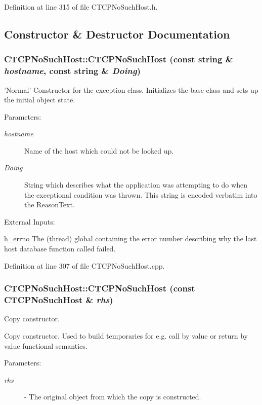 Definition at line 315 of file CTCPNo\-Such\-Host.h.

\subsection{Constructor \& Destructor Documentation}
\subsubsection{\setlength{\rightskip}{0pt plus 5cm}CTCPNo\-Such\-Host::CTCPNo\-Such\-Host (const string \& {\em hostname}, const string \& {\em Doing})}\label{classCTCPNoSuchHost_a0}


'Normal' Constructor for the exception class. Initializes the base class and sets up the initial object state.\begin{Desc}
\item[Parameters: ]\par
\begin{description}
\item[{\em 
hostname}]Name of the host which could not be looked up. \item[{\em 
Doing}]String which describes what the application was attempting to do when the exceptional condition was thrown. This string is encoded verbatim into the Reason\-Text.\end{description}
\end{Desc}
External Inputs:\begin{CompactItemize}
\item 
h\_\-errno The (thread) global containing the error number describing why the last host database function called failed. \end{CompactItemize}


Definition at line 307 of file CTCPNo\-Such\-Host.cpp.
\subsubsection{\setlength{\rightskip}{0pt plus 5cm}CTCPNo\-Such\-Host::CTCPNo\-Such\-Host (const CTCPNo\-Such\-Host \& {\em rhs})}\label{classCTCPNoSuchHost_a1}


Copy constructor.

Copy constructor. Used to build temporaries for e.g. call by value or return by value functional semantics.\begin{Desc}
\item[Parameters: ]\par
\begin{description}
\item[{\em 
rhs}]- The original object from which the copy is constructed. \end{description}
\end{Desc}


